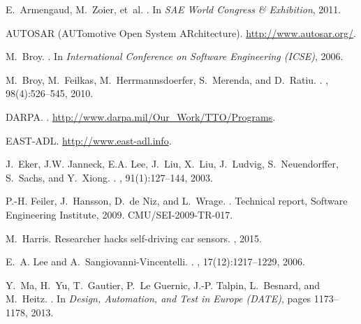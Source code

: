 
\begin{thebibliography}{10}

E.~Armengaud, M.~Zoier, et~al.
.
\newblock In {\em SAE World Congress \& Exhibition}, 2011.

{AUTOSAR (AUTomotive Open System ARchitecture)}.
\newblock \url{http://www.autosar.org/}.

M.~Broy.
.
\newblock In {\em International Conference on Software Engineering (ICSE)},
  2006.

M.~Broy, M.~Feilkas, M.~Herrmannsdoerfer, S.~Merenda, and D.~Ratiu.
.
, 98(4):526--545, 2010.

DARPA.
.
\newblock \url{http://www.darpa.mil/Our\_Work/TTO/Programs}.

{EAST-ADL}.
\newblock \url{http://www.east-adl.info}.

J.~Eker, J.W. Janneck, E.A. Lee, J.~Liu, X.~Liu, J.~Ludvig, S.~Neuendorffer,
  S.~Sachs, and Y.~Xiong.
.
, 91(1):127--144, 2003.

P.-H. Feiler, J.~Hansson, D.~{de Niz}, and L.~Wrage.
.
\newblock Technical report, Software Engineering Institute, 2009.
\newblock CMU/SEI-2009-TR-017.

M.~Harris.
\newblock Researcher hacks self-driving car sensors.
, 2015.

E.~A. Lee and A.~Sangiovanni-Vincentelli.
.
, 17(12):1217--1229, 2006.

Y.~Ma, H.~Yu, T.~Gautier, P.~{Le Guernic}, J.-P. Talpin, L.~Besnard, and
  M.~Heitz.
.
\newblock In {\em Design, Automation, and Test in Europe (DATE)}, pages
  1173--1178, 2013.


\end{thebibliography}
